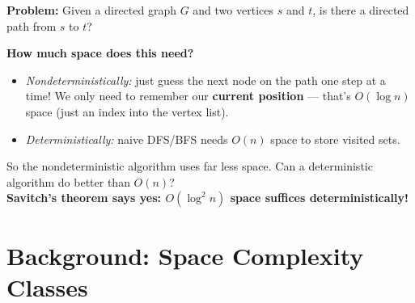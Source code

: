 \documentclass[12pt,a4paper]{article}
\theoremstyle{plain}
\theoremstyle{definition}
\theoremstyle{remark}
\begin{document}
\begin{examplebox}
\textbf{Problem:} Given a directed graph $G$ and two vertices $s$ and $t$, is there a directed path from $s$ to $t$?

\medskip
\begin{center}
\end{center}

\medskip
\textbf{How much space does this need?}
\begin{itemize}
  \item \emph{Nondeterministically:} just guess the next node on the path one step at a time! We only need to remember our \textbf{current position} — that's $O(\log n)$ space (just an index into the vertex list).
  \item \emph{Deterministically:} naive DFS/BFS needs $O(n)$ space to store visited sets.
\end{itemize}
So the nondeterministic algorithm uses far less space. Can a deterministic algorithm do better than $O(n)$?\\
\textbf{Savitch's theorem says yes: $O(\log^2 n)$ space suffices deterministically!}
\end{examplebox}

\section{Background: Space Complexity Classes}
\end{document}
